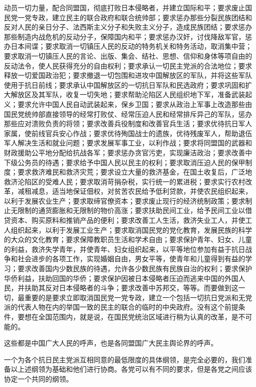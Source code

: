 动员一切力量，配合同盟国，彻底打败日本侵略者，并建立国际和平；要求废止国民党一党专政，建立民主的联合政府和联合统帅部；要求惩办那些分裂民族团结和反对人民的亲日分子、法西斯主义分子和失败主义分子，造成民族团结；要求惩办那些制造内战危机的反动分子，保障国内和平；要求惩办汉奸，讨伐降敌军官，惩办日本间谍；要求取消一切镇压人民的反动的特务机关和特务活动，取消集中营；要求取消一切镇压人民的言论、出版、集会、结社、思想、信仰和身体等项自由的反动法令，使人民获得充分的自由权利；要求承认一切民主党派的合法地位；要求释放一切爱国政治犯；要求撤退一切包围和进攻中国解放区的军队，并将这些军队使用于抗日前线；要求承认中国解放区的一切抗日军队和民选政府；要求巩固和扩大解放区及其军队，收复一切失地；要求帮助沦陷区人民组织地下军，准备武装起义；要求允许中国人民自动武装起来，保乡卫国；要求从政治上军事上改造那些由国民党统帅部直接领导的经常打败仗、经常压迫人民和经常排斥异己的军队，惩办那些应对溃败负责的将领；要求改善兵役制度和改善官兵生活；要求优待抗日军人家属，使前线官兵安心作战；要求优待殉国战士的遗族，优待残废军人，帮助退伍军人解决生活和就业问题；要求发展军事工业，以利作战；要求将同盟国的武器和财政援助公平地分配给抗战各军；要求惩办贪官污吏，实现廉洁政治；要求改善中下级公务员的待遇；要求给予中国人民以民主的权利；要求取消压迫人民的保甲制度；要求救济难民和救济灾荒；要求设立大量的救济基金，在国土收复后，广泛地救济沦陷区的受难人民；要求取消苛捐杂税，实行统一的累进税；要求实行农村改革，减租减息，适当地保证佃权，对贫苦农民给予低利贷款，并使农民组织起来，以利于发展农业生产；要求取缔官僚资本；要求废止现行的经济统制政策；要求制止无限制的通货膨胀和无限制的物价高涨；要求扶助民间工业，给予民间工业以借贷资本、购买原料和推销产品的便利；要求改善工人生活，救济失业工人，并使工人组织起来，以利于发展工业生产；要求取消国民党的党化教育，发展民族的科学的大众的文化教育；要求保障教职员生活和学术自由；要求保护青年、妇女、儿童的利益，救济失学青年，并使青年、妇女组织起来，以平等地位参加有益于抗日战争和社会进步的各项工作，实现婚姻自由，男女平等，使青年和儿童得到有益的学习；要求改善国内少数民族的待遇，允许各少数民族有民族自治的权利；要求保护华侨利益，扶助回国的华侨；要求保护因被日本侵略者压迫而逃来中国的外国人民，并扶助其反对日本侵略者的斗争；要求改善中苏邦交，等等。而要做到这一切，最重要的是要求立即取消国民党一党专政，建立一个包括一切抗日党派和无党派的代表人物在内的举国一致的民主的联合的临时的中央政府。没有这个前提条件，要想在全国范围内，就是说，在国民党统治区域进行稍为认真的改革，是不可能的。

这些都是中国广大人民的呼声，也是各同盟国广大民主舆论界的呼声。

一个为各个抗日民主党派互相同意的最低限度的具体纲领，是完全必要的，我们准备以上述纲领为基础和他们进行协商。各党可以有不同的要求，但是各党之间应该协定一个共同的纲领。

